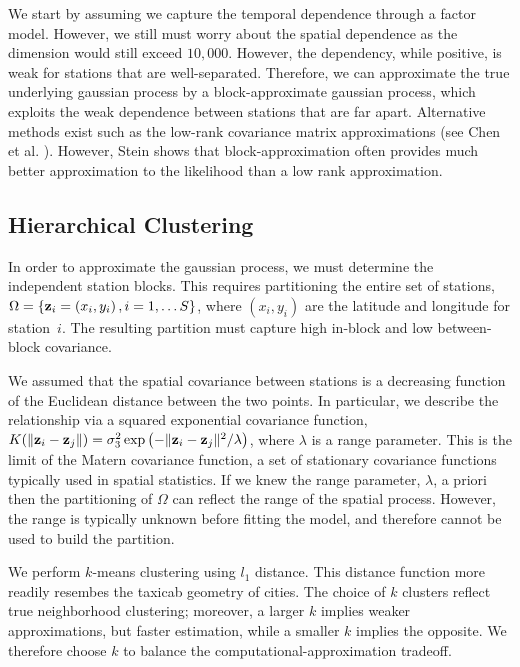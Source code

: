 \documentclass{acm_proc_article-sp}
\begin{document}
We start by assuming we capture the temporal dependence through a factor model.  However, we still must worry about the spatial dependence as the dimension would still exceed $10,000$.   However, the dependency, while positive, is weak for stations that are well-separated.  Therefore, we can approximate the true underlying gaussian process by a block-approximate gaussian process, which exploits the weak dependence between stations that are far apart.  Alternative methods exist such as the low-rank covariance matrix approximations (see Chen et al. \cite{chen:lowrank}).  However, Stein \cite{stein:spatial} shows that block-approximation often provides much better approximation to the likelihood than a low rank approximation.

\subsection{Hierarchical Clustering}\label{clustering}
In order to approximate the gaussian process, we must determine the independent station blocks.  This requires partitioning the entire set of stations, $\Omega = \{ {\bf z}_i = (x_i, y_i) \, , i = 1,\ldots S\}$, where $(x_i, y_i)$ are the latitude and longitude for station~$i$. The resulting partition must capture high in-block and low between-block covariance.  

We assumed that the spatial covariance between stations is a decreasing function of the Euclidean distance between the two points.  In particular, we describe the relationship via a squared exponential covariance function, $K(\| {\bf z}_i - {\bf z}_j \|) = \sigma_3^2 \exp \left( - \| {\bf z}_i - {\bf z}_j \|^2/ \lambda \right)$, where $\lambda$ is a range parameter.  This is the limit of the Matern covariance function, a set of stationary covariance functions typically used in spatial statistics.  If we knew the range parameter, $\lambda$, a priori then the partitioning of $\Omega$ can reflect the range of the spatial process.  However, the range is typically unknown before fitting the model, and therefore cannot be used to build the partition.

We perform $k$-means clustering using $l_1$ distance.  This distance function more readily resembes the taxicab geometry of cities.  The choice of $k$ clusters reflect true neighborhood clustering; moreover, a larger $k$ implies weaker approximations, but faster estimation, while a smaller $k$ implies the opposite.  We therefore choose $k$ to balance the computational-approximation tradeoff.
\end{document}
